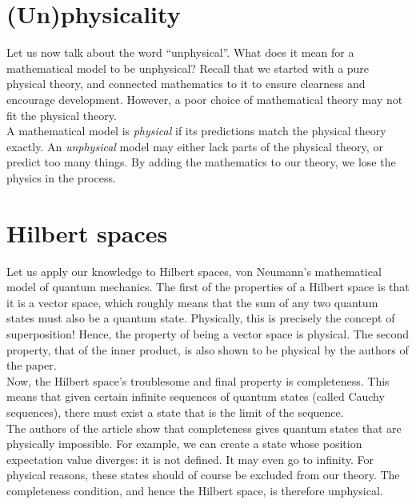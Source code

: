 \documentclass[12pt]{article}
\begin{document}
\begin{multicols}{2}
    \section*{(Un)physicality}
    Let us now talk about the word ``unphysical''. What does it mean for a mathematical model to be unphysical? Recall that we started with a pure physical theory, and connected mathematics to it to ensure clearness and encourage development. However, a poor choice of mathematical theory may not fit the physical theory.\\
    A mathematical model is \textit{physical} if its predictions match the physical theory exactly. An \textit{unphysical} model may either lack parts of the physical theory, or predict too many things. By adding the mathematics to our theory, we lose the physics in the process.
    \section*{Hilbert spaces}
    Let us apply our knowledge to Hilbert spaces, von Neumann's mathematical model of quantum mechanics. The first of the properties of a Hilbert space is that it is a vector space, which roughly means that the sum of any two quantum states must also be a quantum state. Physically, this is precisely the concept of superposition! Hence, the property of being a vector space is physical. The second property, that of the inner product, is also shown to be physical by the authors of the paper.\\
    Now, the Hilbert space's troublesome and final property is completeness. This means that given certain infinite sequences of quantum states (called Cauchy sequences), there must exist a state that is the limit of the sequence.\\
    The authors of the article show that completeness gives quantum states that are physically impossible. For example, we can create a state whose position expectation value diverges: it is not defined. It may even go to infinity. For physical reasons, these states should of course be excluded from our theory. The completeness condition, and hence the Hilbert space, is therefore unphysical. 

\end{multicols}
\end{document}
